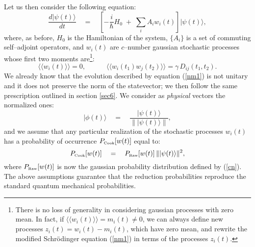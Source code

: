 \documentclass[12pt]{article}
\newcommand{\llangle}{\langle\!\langle}
\newcommand{\rrangle}{\rangle\!\rangle}
\begin{document}
Let us then consider the following equation:
\begin{equation} \label{nm1}
\frac{d|\psi(t)\rangle}{dt} \quad = \quad \left[ -\frac{i}{\hbar}
H_{0}\; +\; \sum_{i} A_{i}w_{i}(t) \right] |\psi(t)\rangle,
\end{equation}
where, as before, $H_{0}$ is the Hamiltonian of the system, $\{
A_{i} \}$ is a set of commuting self--adjoint operators, and
$w_{i}(t)$ are $c$--number gaussian stochastic processes whose
first two moments are\footnote{There is no loss of generality in
considering gaussian processes with zero mean. In fact, if
$\llangle w_{i}(t) \rrangle = m_{i}(t) \neq 0$, we can always
define new processes $z_{i}(t) = w_{i}(t) - m_{i}(t)$, which have
zero mean, and rewrite the modified Schr\"odinger equation (\ref{nm1}) in
terms of the processes $z_{i}(t)$.}:
\begin{equation} \label{cn}
\llangle w_{i}(t) \rrangle = 0, \qquad \quad \llangle w_{i}(t_{1})
w_{j}(t_{2})\rrangle = \gamma\,D_{ij}(t_{1}, t_{2}).
\end{equation}
We already know that the evolution described by equation
(\ref{nm1}) is not unitary and it does not preserve the norm of
the statevector; we then follow the same prescription outlined in
section \ref{sec6}. We consider as {\it physical} vectors the
normalized ones:
\begin{equation} \label{co2}
|\phi(t)\rangle \quad = \quad \frac{|\psi(t)\rangle}{\|
|\psi(t)\rangle \|},
\end{equation}
and we assume that any particular realization of the stochastic
processes $w_{i}(t)$  has a probability of occurrence
$P_{\makebox{\tiny Cook}}[w(t)]$ equal to:
\begin{equation} \label{prob2}
P_{\makebox{\tiny Cook}}[w(t)] \quad = \quad P_{\makebox{\tiny
Raw}}[w(t)]\, \||\psi(t)\rangle\|^{2},
\end{equation}
where $P_{\makebox{\tiny Raw}}[w(t)]$ is now the gaussian
probability distribution defined by (\ref{cn}).  The above
assumptions guarantee that the reduction probabilities reproduce
the standard quantum mechanical probabilities.
\end{document}
